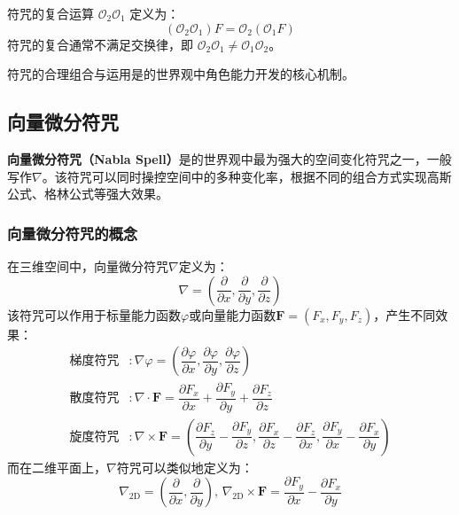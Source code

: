 符咒的复合运算 $\mathcal{O}_2 \mathcal{O}_1$ 定义为：
\begin{equation}
    (\mathcal{O}_2 \mathcal{O}_1)F = \mathcal{O}_2(\mathcal{O}_1 F)
\end{equation}
符咒的复合通常不满足交换律，即 $\mathcal{O}_2 \mathcal{O}_1 \neq \mathcal{O}_1 \mathcal{O}_2$。

符咒的合理组合与运用是\wkn 的世界观中角色能力开发的核心机制。

\subsection{向量微分符咒}\label{subsec:gradient}

\textbf{向量微分符咒（Nabla Spell）}是\wkn 的世界观中最为强大的空间变化符咒之一，一般写作$\nabla$。该符咒可以同时操控空间中的多种变化率，根据不同的组合方式实现高斯公式、格林公式等强大效果。

\subsubsection{向量微分符咒的概念}

\begin{definition}[向量微分符咒]
    在三维空间中，向量微分符咒$\nabla$定义为：
    \begin{equation}
        \nabla = \left(\dfrac{\partial}{\partial x}, \dfrac{\partial}{\partial y}, \dfrac{\partial}{\partial z}\right)
    \end{equation}
    该符咒可以作用于标量能力函数$\varphi$或向量能力函数$\bm{F}=(F_x,F_y,F_z)$，产生不同效果：
    \begin{align*}
        \text{梯度符咒} & : \nabla\varphi = \left(\dfrac{\partial\varphi}{\partial x}, \dfrac{\partial\varphi}{\partial y}, \dfrac{\partial\varphi}{\partial z}\right)                                                                                                      \\
        \text{散度符咒} & : \nabla\cdot\bm{F} = \dfrac{\partial F_x}{\partial x} + \dfrac{\partial F_y}{\partial y} + \dfrac{\partial F_z}{\partial z}                                                                                                                      \\
        \text{旋度符咒} & : \nabla\times\bm{F} = \left(\dfrac{\partial F_z}{\partial y} - \dfrac{\partial F_y}{\partial z}, \dfrac{\partial F_x}{\partial z} - \dfrac{\partial F_z}{\partial x}, \dfrac{\partial F_y}{\partial x} - \dfrac{\partial F_x}{\partial y}\right)
    \end{align*}
    而在二维平面上，$\nabla$符咒可以类似地定义为：
    \begin{equation}
        \nabla_{\text{2D}} = \left(\dfrac{\partial}{\partial x}, \dfrac{\partial}{\partial y}\right),\,
        \nabla_{\text{2D}}\times \bm{F}=\dfrac{\partial F_y}{\partial x} - \dfrac{\partial F_x}{\partial y}
    \end{equation}
\end{definition}


